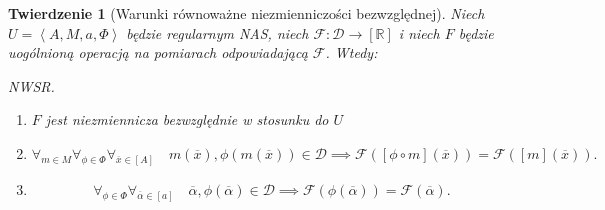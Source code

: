 \documentclass[12pt,a4paper]{report}
\newtheorem{tw}[definition]{Twierdzenie}
\newcommand{\domkniecie}[1]{\left\lbrack{#1}\right\rbrack}
\newcommand{\tuple}[1]{\left\langle {#1} \right\rangle}
\begin{document}
\begin{tw}[Warunki równoważne niezmienniczości bezwzględnej]
Niech $U=\tuple{A,M,a,\Phi}$ będzie regularnym NAS, niech $\mathcal{F}:\mathcal{D}\to \domkniecie{\mathbb{R}}$ i niech $F$ będzie uogólnioną operacją na pomiarach odpowiadającą $\mathcal{F}$. Wtedy:

\item
NWSR.
\begin{enumerate}
\item
$F$ jest niezmiennicza bezwzględnie w stosunku do $U$ 
\item
$$
\forall_{m \in M}\forall_{\phi \in \Phi} \forall_{\overline{x} \in \domkniecie{A}} \quad m(\overline{x}),\phi(m(\overline{x})) \in \mathcal{D} \implies \mathcal{F}( \domkniecie{\phi \circ m}(\overline{x}))=\mathcal{F}(\domkniecie{m}(\overline{x})).
$$
\item
$$
\forall_{\phi \in \Phi} \forall_{\overline{\alpha} \in \domkniecie{a}} \quad \overline{\alpha}, \phi(\overline{\alpha})\in \mathcal{D} \implies \mathcal{F}(\phi(\overline{\alpha}))=\mathcal{F}(\overline{\alpha}).
$$
\end{enumerate}

\end{tw}
\end{document}
